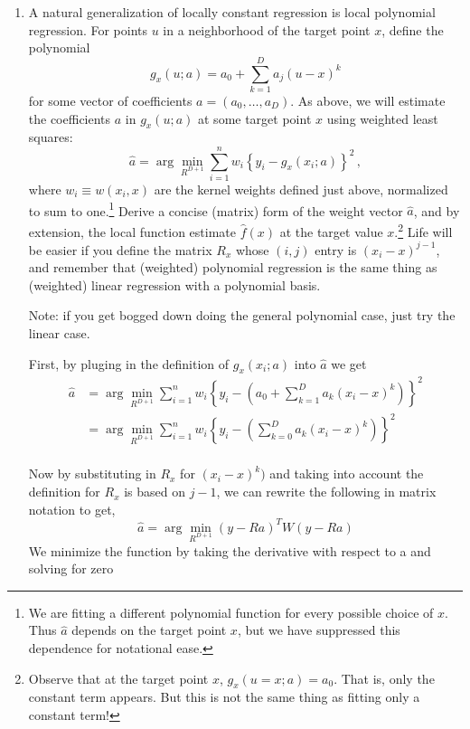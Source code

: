 \documentclass{homework}
\newcommand{\1}{\mathbf{1}}
\begin{document}
\begin{enumerate}[label=(\Alph*)]

\item  A natural generalization of locally constant regression is local polynomial regression.  For points $u$ in a neighborhood of the target point $x$, define the polynomial
$$
g_{x}(u; a) = a_0 + \sum_{k=1}^D a_j(u-x)^k 
$$
for some vector of coefficients $a = (a_0, \ldots, a_D)$.  As above, we will estimate the coefficients $a$ in $g_{x}(u; a)$ at some target point $x$ using weighted least squares:
$$
\hat{a} = \arg \min_{R^{D+1}} \sum_{i=1}^n w_i \left\{ y_i - g_{x}(x_i; a)  \right\}^2 \, ,
$$
where $w_i \equiv w(x_i, x)$ are the kernel weights defined just above, normalized to sum to one.\footnote{We are fitting a different polynomial function for every possible choice of $x$.  Thus $\hat{a}$ depends on the target point $x$, but we have suppressed this dependence for notational ease.} Derive a concise (matrix) form of the weight vector $\hat{a}$, and by extension, the local function estimate $\hat{f}(x)$ at the target value $x$.\footnote{Observe that at the target point $x$, $g_x(u = x; a) = a_0$.  That is, only the constant term appears.  But this is not the same thing as fitting only a constant term!}   Life will be easier if you define the matrix $R_x$ whose $(i,j)$ entry is $(x_i-x)^{j-1}$, and remember that (weighted) polynomial regression is the same thing as (weighted) linear regression with a polynomial basis.

Note: if you get bogged down doing the general polynomial case, just try the linear case.
\\
\par First, by pluging in the definition of $g_x(x_i;a)$ into $\hat{a}$ we get
\begin{equation} \begin{split}
\hat{a} &= \arg \min_{R^{D+1}} \sum_{i=1}^n w_i \left\{ y_i -  ( a_0 + \sum_{k=1}^D a_k(x_i-x)^k )   \right\}^2 \\
&= \arg \min_{R^{D+1}} \sum_{i=1}^n w_i \left\{ y_i -  ( \sum_{k=0}^D a_k(x_i-x)^k )   \right\}^2 \\
\end{split}\end{equation}
\par Now by substituting in $R_x$ for $(x_i - x)^k)$ and taking into account the definition for $R_x$ is based on $j-1$, we can  rewrite the following in matrix notation to get,
$$ \hat{a} = \arg \min_{R^{D+1}} ( y - Ra)^T W (y - Ra) $$
We minimize the function by taking the derivative with respect to a and solving for zero


\end{enumerate}
\end{document}
